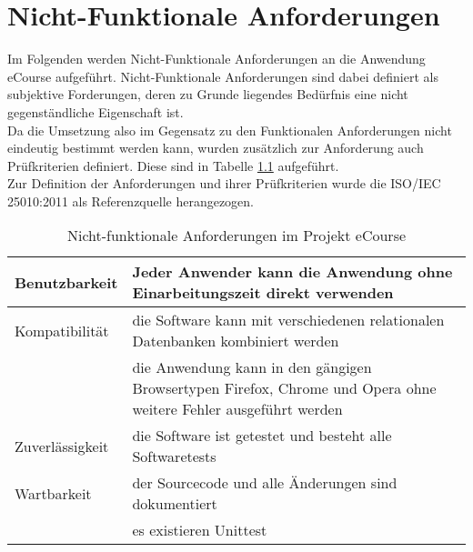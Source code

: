 \chapter{Nicht-Funktionale Anforderungen}
\label{sec:nicht_funktionale_Anforderungen}
Im Folgenden werden Nicht-Funktionale Anforderungen an die Anwendung eCourse aufgeführt. Nicht-Funktionale Anforderungen sind dabei definiert als subjektive Forderungen, deren zu Grunde liegendes Bedürfnis eine nicht gegenständliche Eigenschaft ist. \\
Da die Umsetzung also im Gegensatz zu den Funktionalen Anforderungen nicht eindeutig bestimmt werden kann, wurden zusätzlich zur Anforderung auch Prüfkriterien definiert. Diese sind in Tabelle \ref{tab:nicht-funktionale_Anforderungen} aufgeführt. \\
Zur Definition der Anforderungen und ihrer Prüfkriterien wurde die ISO/IEC 25010:2011 als Referenzquelle herangezogen.

\begin{table}
\centering
	\begin{tabularx}{\textwidth}[H]{|X|X|}
		\hline
		Benutzbarkeit & Jeder Anwender kann die Anwendung ohne Einarbeitungszeit direkt verwenden \\
		\hline 
		Kompatibilität & die Software kann mit verschiedenen relationalen Datenbanken kombiniert werden \\
		\hline 
		\quad & die Anwendung kann in den gängigen Browsertypen Firefox, Chrome und Opera ohne weitere Fehler ausgeführt werden \\
		\hline
		Zuverlässigkeit & die Software ist getestet und besteht alle Softwaretests\\
		\hline
		Wartbarkeit & der Sourcecode und alle Änderungen sind dokumentiert \\
		\hline
		\quad & es existieren Unittest \\
		\hline
	\end{tabularx}
\caption{Nicht-funktionale Anforderungen im Projekt eCourse}
\label{tab:nicht-funktionale_Anforderungen}
\end{table}